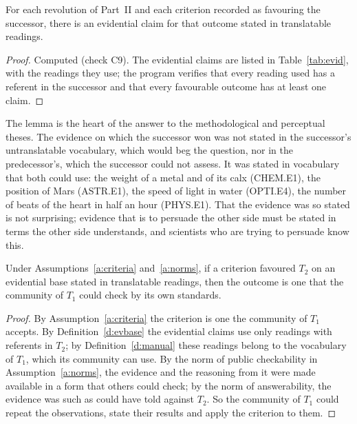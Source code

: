 \documentclass{situationist-preprint}
\begin{document}
\begin{lemma}[Evidence]\label{l:evidence}
For each revolution of Part~II and each criterion recorded as favouring the successor, there is an evidential claim for that outcome stated in translatable readings.
\end{lemma}

\begin{proof}
Computed (check C9). The \nevidall{} evidential claims are listed in Table~\ref{tab:evid}, with the readings they use; the program verifies that every reading used has a referent in the successor and that every favourable outcome has at least one claim.
\end{proof}

The lemma is the heart of the answer to the methodological and perceptual theses. The evidence on which the successor won was not stated in the successor's untranslatable vocabulary, which would beg the question, nor in the predecessor's, which the successor could not assess. It was stated in vocabulary that both could use: the weight of a metal and of its calx (CHEM.E1), the position of Mars (ASTR.E1), the speed of light in water (OPTI.E4), the number of beats of the heart in half an hour (PHYS.E1). That the evidence was so stated is not surprising; evidence that is to persuade the other side must be stated in terms the other side understands, and scientists who are trying to persuade know this.

\begin{proposition}\label{p:shared}
Under Assumptions~\ref{a:criteria} and~\ref{a:norms}, if a criterion favoured $T_2$ on an evidential base stated in translatable readings, then the outcome is one that the community of $T_1$ could check by its own standards.
\end{proposition}

\begin{proof}
By Assumption~\ref{a:criteria} the criterion is one the community of $T_1$ accepts. By Definition~\ref{d:evbase} the evidential claims use only readings with referents in $T_2$; by Definition~\ref{d:manual} these readings belong to the vocabulary of $T_1$, which its community can use. By the norm of public checkability in Assumption~\ref{a:norms}, the evidence and the reasoning from it were made available in a form that others could check; by the norm of answerability, the evidence was such as could have told against $T_2$. So the community of $T_1$ could repeat the observations, state their results and apply the criterion to them.
\end{proof}
\end{document}
